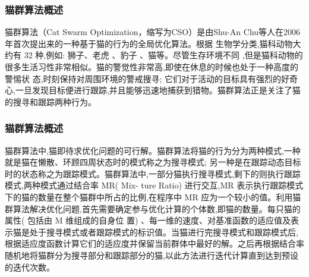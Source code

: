 \begin{frame}
	\frametitle{猫群算法概述}
	猫群算法（Cat Swarm Optimization，缩写为CSO）是由Shu-An Chu等人在2006 年首次提出来的一种基于猫的行为的全局优化算法。根据 生物学分类,猫科动物大约有 32 种,例如: 狮子、老虎 、豹子 、猫等。尽管生存环境不同 ,但是猫科动物的很多生活习性非常相似。猫的警觉性非常高,即使在休息的时候也处于一种高度的警惕状 态,时刻保持对周围环境的警戒搜寻; 它们对于活动的目标具有强烈的好奇心,一旦发现目标便进行跟踪,并且能够迅速地捕获到猎物。猫群算法正是关注了猫的搜寻和跟踪两种行为。
\end{frame}


\begin{frame}
	\frametitle{猫群算法概述}
	猫群算法中,猫即待求优化问题的可行解。猫群算法将猫的行为分为两种模式,一种就是猫在懒散、环顾四周状态时的模式称之为搜寻模式; 另一种是在跟踪动态目标时的状态称之为跟踪模式。猫群算法中,一部分猫执行搜寻模式,剩下的则执行跟踪模式,两种模式通过结合率 MR( Mix- ture Ratio) 进行交互,MR 表示执行跟踪模式下的猫的数量在整个猫群中所占的比例,在程序中 MR 应为一个较小的值。利用猫群算法解决优化问题,首先需要确定参与优化计算的个体数,即猫的数量。每只猫的属性( 包括由 M 维组成的自身位 置) 、每一维的速度、对基准函数的适应值及表示猫是处于搜寻模式或者跟踪模式的标识值。当猫进行完搜寻模式和跟踪模式后,根据适应度函数计算它们的适应度并保留当前群体中最好的解。之后再根据结合率随机地将猫群分为搜寻部分和跟踪部分的猫,以此方法进行迭代计算直到达到预设的迭代次数。
\end{frame}


